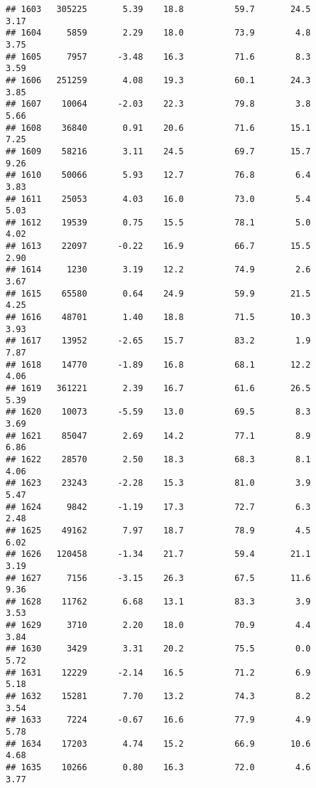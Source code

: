 \documentclass[
]{article}
\begin{document}
\begin{verbatim}
## 1603   305225       5.39    18.8          59.7       24.5              3.17
## 1604     5859       2.29    18.0          73.9        4.8              3.75
## 1605     7957      -3.48    16.3          71.6        8.3              3.59
## 1606   251259       4.08    19.3          60.1       24.3              3.85
## 1607    10064      -2.03    22.3          79.8        3.8              5.66
## 1608    36840       0.91    20.6          71.6       15.1              7.25
## 1609    58216       3.11    24.5          69.7       15.7              9.26
## 1610    50066       5.93    12.7          76.8        6.4              3.83
## 1611    25053       4.03    16.0          73.0        5.4              5.03
## 1612    19539       0.75    15.5          78.1        5.0              4.02
## 1613    22097      -0.22    16.9          66.7       15.5              2.90
## 1614     1230       3.19    12.2          74.9        2.6              3.67
## 1615    65580       0.64    24.9          59.9       21.5              4.25
## 1616    48701       1.40    18.8          71.5       10.3              3.93
## 1617    13952      -2.65    15.7          83.2        1.9              7.87
## 1618    14770      -1.89    16.8          68.1       12.2              4.06
## 1619   361221       2.39    16.7          61.6       26.5              5.39
## 1620    10073      -5.59    13.0          69.5        8.3              3.69
## 1621    85047       2.69    14.2          77.1        8.9              6.86
## 1622    28570       2.50    18.3          68.3        8.1              4.06
## 1623    23243      -2.28    15.3          81.0        3.9              5.47
## 1624     9842      -1.19    17.3          72.7        6.3              2.48
## 1625    49162       7.97    18.7          78.9        4.5              6.02
## 1626   120458      -1.34    21.7          59.4       21.1              3.19
## 1627     7156      -3.15    26.3          67.5       11.6              9.36
## 1628    11762       6.68    13.1          83.3        3.9              3.53
## 1629     3710       2.20    18.0          70.9        4.4              3.84
## 1630     3429       3.31    20.2          75.5        0.0              5.72
## 1631    12229      -2.14    16.5          71.2        6.9              5.18
## 1632    15281       7.70    13.2          74.3        8.2              3.54
## 1633     7224      -0.67    16.6          77.9        4.9              5.78
## 1634    17203       4.74    15.2          66.9       10.6              4.68
## 1635    10266       0.80    16.3          72.0        4.6              3.77

\end{verbatim}
\end{document}
